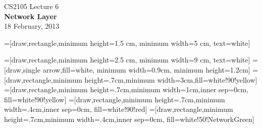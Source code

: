 \begin{cf}{
CS2105 Lecture 6\\
\large
\textbf{Network Layer\\[10pt]}
\normalsize
	18 February, 2013
}
\end{cf}

\begin{cf}{
=[draw,rectangle,minimum height=1.5 cm, minimum width=5 cm, text=white]
}
\end{cf}

=[draw,rectangle,minimum height=2.5 cm, minimum width=9 cm, text=white]
=[draw,single arrow,fill=white, minimum width=0.9cm, minimum height=1.2cm]
=[draw,rectangle,minimum height=.7cm,minimum width=3cm,fill=white!90!yellow]
=[draw,rectangle,minimum height=.7cm,minimum width=1cm,inner sep=0cm, fill=white!90!yellow]
=[draw,rectangle,minimum height=.7cm,minimum width=.4cm,inner sep=0cm, fill=white!90!red]
=[draw,rectangle,minimum height=.7cm,minimum width=.4cm,inner sep=0cm, fill=white!50!NetworkGreen]

\newcommand{\segment}[3]{
    \node[segment header](#1)[#3]{};
    \node[segment payload](#2)[right=0cm of #1]{};
}
\newcommand{\datagramwithsegmentheader}[3]{
    \node[datagram header](#1)[#3]{};
    \node[segment header](#1-P)[right=0cm of #1]{};
    \node[segment payload](#2)[minimum width=0.6cm, right=0cm of #1-P]{};
}
\newcommand{\datagramwithoutsegmentheader}[3]{
    \node[datagram header](#1)[#3]{};
    \node[segment payload](#2)[minimum width=0.4cm, right=0cm of #1]{};
}

